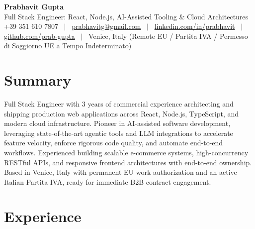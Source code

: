 \documentclass[a4paper,10pt]{article}
\begin{document}
\begin{minipage}[c]{0.80\textwidth}
  {\Huge\bfseries Prabhavit Gupta}\\[3pt]
  {\color{accent}\large Full Stack Engineer: React, Node.js, AI-Assisted Tooling \& Cloud Architectures}\\[6pt]
  {\footnotesize +39 351 610 7807 ~$\vert$~
  \href{mailto:prabhavitg@gmail.com}{prabhavitg@gmail.com} ~$\vert$~
  \href{https://www.linkedin.com/in/prabhavit/}{linkedin.com/in/prabhavit} ~$\vert$~
  \href{https://github.com/prab-gupta}{github.com/prab-gupta} ~$\vert$~
  Venice, Italy (Remote EU / Partita IVA / Permesso di Soggiorno UE a Tempo Indeterminato)}
\end{minipage}\hfill

\section{Summary}
Full Stack Engineer with 3 years of commercial experience architecting and shipping production web applications across React, Node.js, TypeScript, and modern cloud infrastructure. Pioneer in AI-assisted software development, leveraging state-of-the-art agentic tools and LLM integrations to accelerate feature velocity, enforce rigorous code quality, and automate end-to-end workflows. Experienced building scalable e-commerce systems, high-concurrency RESTful APIs, and responsive frontend architectures with end-to-end ownership. Based in Venice, Italy with permanent EU work authorization and an active Italian Partita IVA, ready for immediate B2B contract engagement.

\section{Experience}
\end{document}
